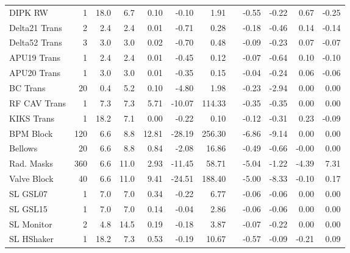 \begin{sidewaystable}
{\begin{tabular}{l d{0} d{-1} d{-1} d{-1} d{-1} d{-1} c d{-1} d{-1} d{-1} d{-1}}
            DIPK RW        &  1   &  18.0  &  6.7    &   0.10 &   -0.10 &    1.91 & &   -0.55 &   -0.22 &   0.67 &  -0.25 \\
            Delta21 Trans  &  2   &  2.4   &  2.4    &   0.01 &   -0.71 &    0.28 & &   -0.18 &   -0.46 &   0.14 &  -0.14 \\
            Delta52 Trans  &  3   &  3.0   &  3.0    &   0.02 &   -0.70 &    0.48 & &   -0.09 &   -0.23 &   0.07 &  -0.07 \\
            APU19 Trans    &  1   &  2.4   &  2.4    &   0.01 &   -0.45 &    0.12 & &   -0.07 &   -0.64 &   0.10 &  -0.10 \\
            APU20 Trans    &  1   &  3.0   &  3.0    &   0.01 &   -0.35 &    0.15 & &   -0.04 &   -0.24 &   0.06 &  -0.06 \\
            BC Trans       &  20  &  0.4   &  5.2    &   0.10 &   -4.80 &    1.98 & &   -0.23 &   -2.94 &   0.00 &   0.00 \\
            RF CAV Trans   &  1   &  7.3   &  7.3    &   5.71 &  -10.07 &  114.33 & &   -0.35 &   -0.35 &   0.00 &   0.00 \\
            KIKS Trans     &  1   &  18.2  &  7.1    &   0.00 &   -0.22 &    0.10 & &   -0.12 &   -0.31 &   0.23 &  -0.09 \\
            BPM Block      & 120  &  6.6   &  8.8    &  12.81 &  -28.19 &  256.30 & &   -6.86 &   -9.14 &   0.00 &   0.00 \\
            Bellows        &  20  &  6.6   &  8.8    &   0.84 &   -2.08 &   16.86 & &   -0.49 &   -0.66 &  -0.00 &   0.00 \\
            Rad. Masks     & 360  &  6.6   &  11.0   &   2.93 &  -11.45 &   58.71 & &   -5.04 &   -1.22 &  -4.39 &   7.31 \\
            Valve Block    &  40  &  6.6   &  11.0   &   9.41 &  -24.51 &  188.40 & &   -5.00 &   -8.33 &  -0.10 &   0.17 \\
            SL GSL07       &  1   &  7.0   &  7.0    &   0.34 &   -0.22 &    6.77 & &   -0.06 &   -0.06 &   0.00 &   0.00 \\
            SL GSL15       &  1   &  7.0   &  7.0    &   0.14 &   -0.04 &    2.86 & &   -0.06 &   -0.06 &   0.00 &   0.00 \\
            SL Monitor     &  2   &  4.8   &  14.5   &   0.19 &   -0.18 &    3.87 & &   -0.07 &   -0.22 &   0.00 &   0.00 \\
            SL HShaker     &  1   &  18.2  &  7.3    &   0.53 &   -0.19 &   10.67 & &   -0.57 &   -0.09 &  -0.21 &   0.09 \\

\end{tabular}}
\end{sidewaystable}
